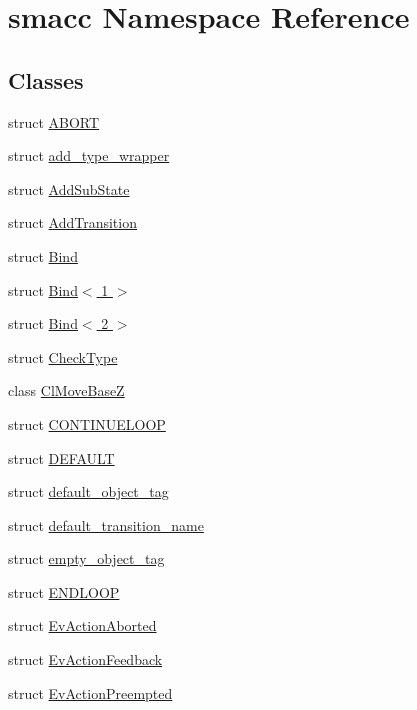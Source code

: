 \hypertarget{namespacesmacc}{}\section{smacc Namespace Reference}
\label{namespacesmacc}
\subsection*{Classes}
\begin{DoxyCompactItemize}
\item 
struct \hyperlink{structsmacc_1_1ABORT}{A\+B\+O\+RT}
\item 
struct \hyperlink{structsmacc_1_1add__type__wrapper}{add\+\_\+type\+\_\+wrapper}
\item 
struct \hyperlink{structsmacc_1_1AddSubState}{Add\+Sub\+State}
\item 
struct \hyperlink{structsmacc_1_1AddTransition}{Add\+Transition}
\item 
struct \hyperlink{structsmacc_1_1Bind}{Bind}
\item 
struct \hyperlink{structsmacc_1_1Bind_3_011_01_4}{Bind$<$ 1 $>$}
\item 
struct \hyperlink{structsmacc_1_1Bind_3_012_01_4}{Bind$<$ 2 $>$}
\item 
struct \hyperlink{structsmacc_1_1CheckType}{Check\+Type}
\item 
class \hyperlink{classsmacc_1_1ClMoveBaseZ}{Cl\+Move\+BaseZ}
\item 
struct \hyperlink{structsmacc_1_1CONTINUELOOP}{C\+O\+N\+T\+I\+N\+U\+E\+L\+O\+OP}
\item 
struct \hyperlink{structsmacc_1_1DEFAULT}{D\+E\+F\+A\+U\+LT}
\item 
struct \hyperlink{structsmacc_1_1default__object__tag}{default\+\_\+object\+\_\+tag}
\item 
struct \hyperlink{structsmacc_1_1default__transition__name}{default\+\_\+transition\+\_\+name}
\item 
struct \hyperlink{structsmacc_1_1empty__object__tag}{empty\+\_\+object\+\_\+tag}
\item 
struct \hyperlink{structsmacc_1_1ENDLOOP}{E\+N\+D\+L\+O\+OP}
\item 
struct \hyperlink{structsmacc_1_1EvActionAborted}{Ev\+Action\+Aborted}
\item 
struct \hyperlink{structsmacc_1_1EvActionFeedback}{Ev\+Action\+Feedback}
\item 
struct \hyperlink{structsmacc_1_1EvActionPreempted}{Ev\+Action\+Preempted}

\end{DoxyCompactItemize}
